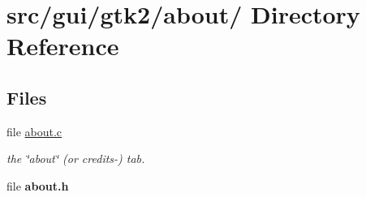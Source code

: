\hypertarget{dir_000003}{
\section{src/gui/gtk2/about/ Directory Reference}
\label{dir_000003}
}
\subsection*{Files}
\begin{CompactItemize}
\item 
file \hyperlink{about_8c}{about.c}
\begin{CompactList}\small\item\em the \char`\"{}about\char`\"{} (or credits-) tab. \item\end{CompactList}

\item 
file {\bf about.h}
\end{CompactItemize}
